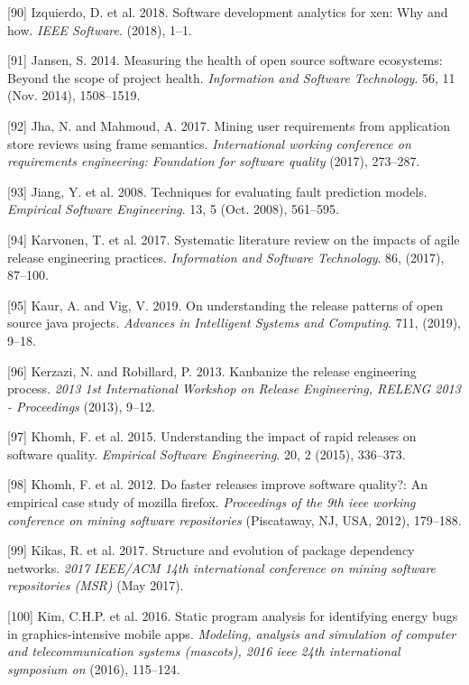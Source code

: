 \documentclass[]{book}
\begin{document}
\hypertarget{ref-Izquierdo2018}{}
{[}90{]} Izquierdo, D. et al. 2018. Software development analytics for
xen: Why and how. \emph{IEEE Software}. (2018), 1--1.

\hypertarget{ref-Jansen2014}{}
{[}91{]} Jansen, S. 2014. Measuring the health of open source software
ecosystems: Beyond the scope of project health. \emph{Information and
Software Technology}. 56, 11 (Nov. 2014), 1508--1519.

\hypertarget{ref-jha2017mining}{}
{[}92{]} Jha, N. and Mahmoud, A. 2017. Mining user requirements from
application store reviews using frame semantics. \emph{International
working conference on requirements engineering: Foundation for software
quality} (2017), 273--287.

\hypertarget{ref-Jiang2008}{}
{[}93{]} Jiang, Y. et al. 2008. Techniques for evaluating fault
prediction models. \emph{Empirical Software Engineering}. 13, 5 (Oct.
2008), 561--595.

\hypertarget{ref-karvonen2017a}{}
{[}94{]} Karvonen, T. et al. 2017. Systematic literature review on the
impacts of agile release engineering practices. \emph{Information and
Software Technology}. 86, (2017), 87--100.

\hypertarget{ref-kaur2019a}{}
{[}95{]} Kaur, A. and Vig, V. 2019. On understanding the release
patterns of open source java projects. \emph{Advances in Intelligent
Systems and Computing}. 711, (2019), 9--18.

\hypertarget{ref-kerzazi2013a}{}
{[}96{]} Kerzazi, N. and Robillard, P. 2013. Kanbanize the release
engineering process. \emph{2013 1st International Workshop on Release
Engineering, RELENG 2013 - Proceedings} (2013), 9--12.

\hypertarget{ref-khomh2015a}{}
{[}97{]} Khomh, F. et al. 2015. Understanding the impact of rapid
releases on software quality. \emph{Empirical Software Engineering}. 20,
2 (2015), 336--373.

\hypertarget{ref-khomh2012a}{}
{[}98{]} Khomh, F. et al. 2012. Do faster releases improve software
quality?: An empirical case study of mozilla firefox. \emph{Proceedings
of the 9th ieee working conference on mining software repositories}
(Piscataway, NJ, USA, 2012), 179--188.

\hypertarget{ref-Kikas2017}{}
{[}99{]} Kikas, R. et al. 2017. Structure and evolution of package
dependency networks. \emph{2017 IEEE/ACM 14th international conference
on mining software repositories (MSR)} (May 2017).

\hypertarget{ref-KKK2016}{}
{[}100{]} Kim, C.H.P. et al. 2016. Static program analysis for
identifying energy bugs in graphics-intensive mobile apps.
\emph{Modeling, analysis and simulation of computer and
telecommunication systems (mascots), 2016 ieee 24th international
symposium on} (2016), 115--124.
\end{document}
